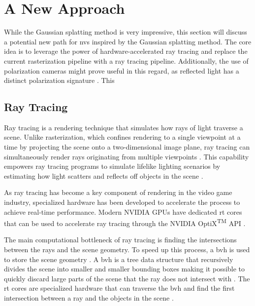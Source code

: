 \section{A New Approach}
While the Gaussian splatting method is very impressive, this section will discuss a potential new path for \gls{nvs} inspired by the Gaussian splatting method.
The core idea is to leverage the power of hardware-accelerated ray tracing and replace the current rasterization pipeline with a ray tracing pipeline.
Additionally, the use of polarization cameras might prove useful in this regard, as reflected light has a distinct polarization signature \cite{lingUniversityPhysicsVolume2016}.
This


\subsection{Ray Tracing}
Ray tracing is a rendering technique that simulates how rays of light traverse a scene.
Unlike rasterization, which confines rendering to a single viewpoint at a time by projecting the scene onto a two-dimensional image plane, ray tracing can simultaneously render rays originating from multiple viewpoints \cite{caulfieldWhatPathTracing2022}.
This capability empowers ray tracing programs to simulate lifelike lighting scenarios by estimating how light scatters and reflects off objects in the scene \cite{caulfieldWhatPathTracing2022}.

As ray tracing has become a key component of rendering in the video game industry, specialized hardware has been developed to accelerate the process to achieve real-time performance.
Modern NVIDIA GPUs have dedicated \gls{rt} cores that can be used to accelerate ray tracing through the NVIDIA OptiX\textsuperscript{TM} API \cite{nvidiaNVIDIAOptiXProgramming2023}.

The main computational bottleneck of ray tracing is finding the intersections between the rays and the scene geometry.
To speed up this process, a \gls{bvh} is used to store the scene geometry \cite{nvidiaNVIDIAOptiXProgramming2023}.
A \gls{bvh} is a tree data structure that recursively divides the scene into smaller and smaller bounding boxes making it possible to quickly discard large parts of the scene that the ray does not intersect with \cite{nvidiaNVIDIAOptiXProgramming2023}.
The \gls{rt} cores are specialized hardware that can traverse the \gls{bvh} and find the first intersection between a ray and the objects in the scene \cite{nvidiaNVIDIAOptiXProgramming2023}.

